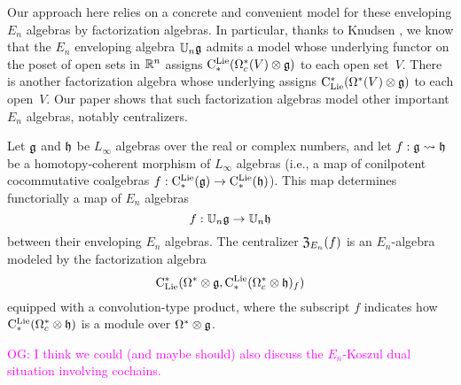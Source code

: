 \documentclass[11pt]{amsart}
\numberwithin{equation}{section}
\def\owen{\textcolor{magenta}{OG: }\textcolor{magenta}}
\begin{document}
Our approach here relies on a concrete and convenient model for these enveloping $E_n$ algebras by factorization algebras.
In particular, thanks to Knudsen \cite{Knudsen}, 
we know that the $E_n$ enveloping algebra $\mathbb U_n \mathfrak g$ admits a model whose underlying functor on the poset of open sets in $\mathbb R^n$ assigns ${\rm C}^{\rm Lie}_*(\Omega_c^*(V) \otimes \mathfrak g)$ to each open set~$V$.
There is another factorization algebra whose underlying assigns ${\rm C}_{\rm Lie}^*(\Omega^*(V) \otimes \mathfrak g)$ to each open~$V$.
Our paper shows that such factorization algebras model other important $E_n$ algebras, notably centralizers.

\begin{thm}
\label{thm: centralizer}
Let $\mathfrak g$ and $\mathfrak h$ be $L_\infty$ algebras over the real or complex numbers, 
and let $f: \mathfrak g \rightsquigarrow \mathfrak h$ be a homotopy-coherent morphism of $L_\infty$ algebras
(i.e., a map of conilpotent cocommutative coalgebras $f: {\rm C}^{\rm Lie}_*(\mathfrak g) \to {\rm C}^{\rm Lie}_*(\mathfrak h)$).
This map determines functorially a map of $E_n$ algebras
\[
f: \mathbb U_n \mathfrak g \to \mathbb U_n \mathfrak h
\]
between their enveloping $E_n$ algebras.
The centralizer ${\frak Z}_{E_n}(f)$ is an $E_n$-algebra modeled by the factorization algebra 
\[
{\rm C}_{\rm Lie}^*(\Omega^* \otimes \mathfrak g, {\rm C}^{\rm Lie}_*(\Omega^*_c \otimes \mathfrak h)_f)
\]
equipped with a convolution-type product,
where the subscript $f$ indicates how ${\rm C}^{\rm Lie}_*(\Omega^*_c \otimes \mathfrak h)$ is a module over $\Omega^* \otimes \mathfrak g$.
\end{thm}

\owen{I think we could (and maybe should) also discuss the $E_n$-Koszul dual situation involving cochains.}

\def\Disk{{\rm Disk}}
\end{document}
